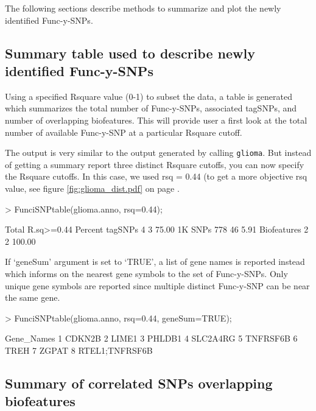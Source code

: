 \documentclass[12pt,fullpage]{article}
\newcommand{\Robject}[1]{{\texttt{#1}}}
\begin{document}
The following sections describe methods to summarize and plot the newly
identified Func-y-SNPs.

\subsection{Summary table used to describe newly identified Func-y-SNPs}

Using a specified Rsquare value (0-1) to subset the data, a table is generated
which summarizes the total number of Func-y-SNPs, associated tagSNPs, and number
of overlapping biofeatures. This will provide user a first look at the total
number of available Func-y-SNP at a particular Rsquare cutoff.

The output is very similar to the output generated by calling \Robject{glioma}.
But instead of getting a summary report three distinct Rsquare cutoffs, you can
now specify the Rsquare cutoffs.  In this case, we used rsq = 0.44 (to get a
        more objective rsq value, see figure \ref{fig:glioma_dist.pdf} on page
        \pageref{fig:glioma_dist.pdf}.

\begin{Schunk}
\begin{Sinput}
> FunciSNPtable(glioma.anno, rsq=0.44);
\end{Sinput}
\begin{Soutput}
            Total R.sq>=0.44 Percent
tagSNPs         4          3   75.00
1K SNPs       778         46    5.91
Biofeatures     2          2  100.00
\end{Soutput}
\end{Schunk}

If `geneSum' argument is set to `TRUE', a list of gene names is reported
instead which informs on the nearest gene symbols to the set of Func-y-SNPs.
Only unique gene symbols are reported since multiple distinct Func-y-SNP can be
near the same gene.

\begin{Schunk}
\begin{Sinput}
> FunciSNPtable(glioma.anno, rsq=0.44, geneSum=TRUE);
\end{Sinput}
\begin{Soutput}
      Gene_Names
1         CDKN2B
2          LIME1
3         PHLDB1
4       SLC2A4RG
5       TNFRSF6B
6           TREH
7          ZGPAT
8 RTEL1;TNFRSF6B
\end{Soutput}
\end{Schunk}

\subsection{Summary of correlated SNPs overlapping biofeatures}
\end{document}
